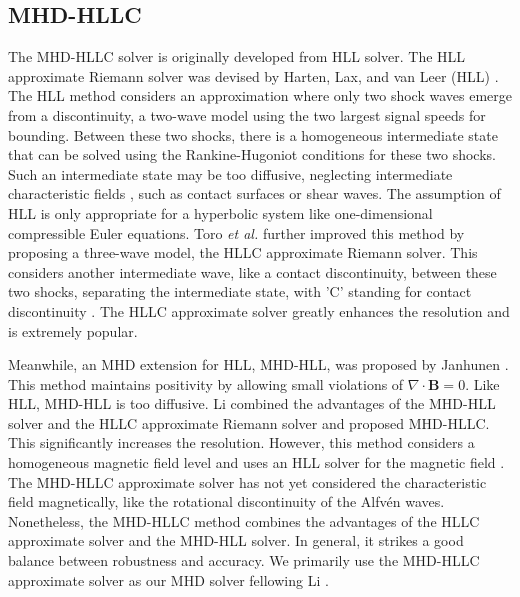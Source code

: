 \subsection{MHD-HLLC}
The MHD-HLLC solver is originally developed from HLL solver. The HLL approximate Riemann solver was devised by Harten, Lax, and van Leer (HLL) \cite{harten1983upstream}. The HLL method considers an approximation where only two shock waves emerge from a discontinuity, a two-wave model using the two largest signal speeds for bounding. Between these two shocks, there is a homogeneous intermediate state that can be solved using the Rankine-Hugoniot conditions for these two shocks. Such an intermediate state may be too diffusive, neglecting intermediate characteristic fields \cite{toro2019hllc}, such as contact surfaces or shear waves. The assumption of HLL is only appropriate for a hyperbolic system like one-dimensional compressible Euler equations. Toro \textit{et al.} further improved this method by proposing a three-wave model, the HLLC approximate Riemann solver. This considers another intermediate wave, like a contact discontinuity, between these two shocks, separating the intermediate state, with 'C' standing for contact discontinuity \cite{toro1994restoration,toro2013riemann,toro2019hllc}. The HLLC approximate solver greatly enhances the resolution and is extremely popular.

Meanwhile, an MHD extension for HLL, MHD-HLL, was proposed by Janhunen \cite{janhunen2000positive}. This method maintains positivity by allowing small violations of $\nabla\cdot\mathbf{B}=0$. Like HLL, MHD-HLL is too diffusive. Li \cite{li2005hllc} combined the advantages of the MHD-HLL solver and the HLLC approximate Riemann solver and proposed MHD-HLLC. This significantly increases the resolution. However, this method considers a homogeneous magnetic field level and uses an HLL solver for the magnetic field \cite{miki2007large}. The MHD-HLLC approximate solver has not yet considered the characteristic field magnetically, like the rotational discontinuity of the Alfvén waves. Nonetheless, the MHD-HLLC method combines the advantages of the HLLC approximate solver and the MHD-HLL solver. In general, it strikes a good balance between robustness and accuracy. We primarily use the MHD-HLLC approximate solver as our MHD solver fellowing Li \cite{li2005hllc}.

